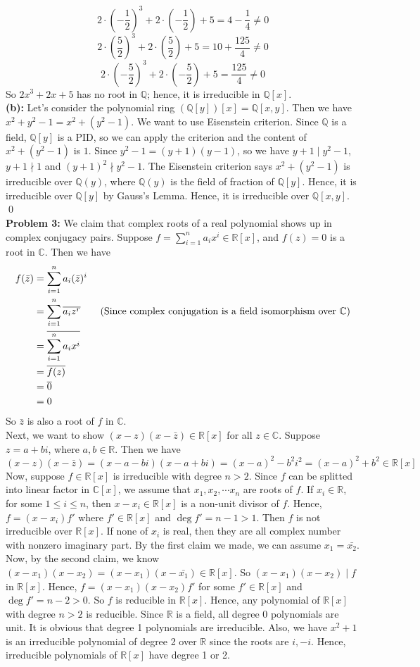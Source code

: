 \documentclass[12pt]{amsart}
\newcommand{\R}{\mathbb{R}}
\newcommand{\Q}{\mathbb{Q}}
\newcommand{\C}{\mathbb{C}}
\begin{document}
\[2\cdot (-\frac{1}{2})^3+2\cdot (-\frac{1}{2})+5=4-\frac{1}{4}\neq 0\]
\[2\cdot (\frac{5}{2})^3+2\cdot (\frac{5}{2})+5=10+\frac{125}{4}\neq 0\]
\[2\cdot (-\frac{5}{2})^3+2\cdot (-\frac{5}{2})+5=\frac{125}{4}\neq 0\]
So $2x^3+2x+5$ has no root in $\Q$; hence, it is irreducible in $\Q[x]$.\\
\textbf{(b):} Let's consider the polynomial ring $(\Q[y])[x]=\Q[x,y]$. Then we have $x^2+y^2-1=x^2+(y^2-1)$. We want to use Eisenstein criterion. Since $\Q$ is a field, $\Q[y]$ is a PID, so we can apply the criterion and the content of $x^2+(y^2-1)$ is $1$. Since $y^2-1=(y+1)(y-1)$, so we have $y+1\mid y^2-1$, $y+1\nmid 1$ and $(y+1)^2\nmid y^2-1$. The Eisenstein criterion says $x^2+(y^2-1)$ is irreducible over $\Q(y)$, where $\Q(y)$ is the field of fraction of $\Q[y]$. Hence, it is irreducible over $\Q[y]$ by Gauss's Lemma. Hence, it is irreducible over $\Q[x,y]$.
\\\qed\\
\textbf{Problem 3:} We claim that complex roots of a real polynomial shows up in complex conjugacy pairs. Suppose $f=\sum_{i=1}^n a_ix^i\in \R[x]$, and $f(z)=0$ is a root in $\C$. Then we have 
\begin{align*}
    f(\bar{z})&=\sum_{i=1}^na_i(\bar{z})^i\\
    &=\sum_{i=1}^n \overline{a_iz^r}\tag{Since complex conjugation is a field isomorphism over $\C$}\\
    &=\overline{\sum_{i=1}^na_ix^i}\\
    &=\overline{f(z)}\\
    &=\overline{0}\\
    &=0
\end{align*}
So $\bar{z}$ is also a root of $f$ in $\C$.\\
Next, we want to show $(x-z)(x-\bar{z})\in \R[x]$ for all $z\in \C$. Suppose $z=a+bi$, where $a,b\in \R$. Then we have 
\[(x-z)(x-\bar{z})=(x-a-bi)(x-a+bi)=(x-a)^2-b^2i^2=(x-a)^2+b^2\in \R[x]\]
Now, suppose $f\in \R[x]$ is irreducible with degree $n>2$. Since $f$ can be splitted into linear factor in $\C[x]$, we assume that $x_1,x_2,\cdots x_n$ are roots of $f$. If $x_i\in \R$, for some $1\leq i\leq n$, then $x-x_i\in \R[x]$ is a non-unit divisor of $f$. Hence, $f=(x-x_i)f'$ where $f'\in \R[x]$ and $\deg f'=n-1>1$. Then $f$ is not irreducible over $\R[x]$. If none of $x_i$ is real, then they are all complex number with nonzero imaginary part. By the first claim we made, we can assume $x_1=\bar{x_2}$. Now, by the second claim, we know $(x-x_1)(x-x_2)=(x-x_1)(x-\bar{x
_1})\in \R[x]$. So $(x-x_1)(x-x_2)\mid f$ in $\R[x]$. Hence, $f=(x-x_1)(x-x_2)f'$ for some $f'\in \R[x]$ and $\deg f'=n-2>0$. So $f$ is reducible in $\R[x]$. Hence, any polynomial of $\R[x]$ with degree $n>2$ is reducible. Since $\R$ is a field, all degree 0 polynomials are unit. It is obvious that degree 1 polynomials are irreducible. Also, we have $x^2+1$ is an irreducible polynomial of degree 2 over $\R$ since the roots are $i,-i$. Hence, irreducible polynomials of $\R[x]$ have degree 1 or 2.
\end{document}
